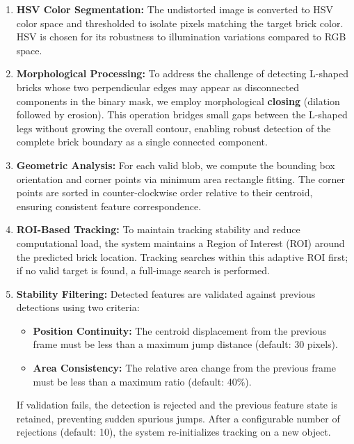 \begin{enumerate}
    \item \textbf{HSV Color Segmentation:} The undistorted image is converted to HSV color space and thresholded to isolate pixels matching the target brick color. HSV is chosen for its robustness to illumination variations compared to RGB space.
    
    \item \textbf{Morphological Processing:} To address the challenge of detecting L-shaped bricks whose two perpendicular edges may appear as disconnected components in the binary mask, we employ morphological \textbf{closing} (dilation followed by erosion). This operation bridges small gaps between the L-shaped legs without growing the overall contour, enabling robust detection of the complete brick boundary as a single connected component.
    
    \item \textbf{Geometric Analysis:} For each valid blob, we compute the bounding box orientation and corner points via minimum area rectangle fitting. The corner points are sorted in counter-clockwise order relative to their centroid, ensuring consistent feature correspondence.
    
    \item \textbf{ROI-Based Tracking:} To maintain tracking stability and reduce computational load, the system maintains a Region of Interest (ROI) around the predicted brick location. Tracking searches within this adaptive ROI first; if no valid target is found, a full-image search is performed.
    
    \item \textbf{Stability Filtering:} Detected features are validated against previous detections using two criteria:
    \begin{itemize}
        \item \textbf{Position Continuity:} The centroid displacement from the previous frame must be less than a maximum jump distance (default: 30 pixels).
        \item \textbf{Area Consistency:} The relative area change from the previous frame must be less than a maximum ratio (default: 40\%).
    \end{itemize}
    
    If validation fails, the detection is rejected and the previous feature state is retained, preventing sudden spurious jumps. After a configurable number of rejections (default: 10), the system re-initializes tracking on a new object.
\end{enumerate}

